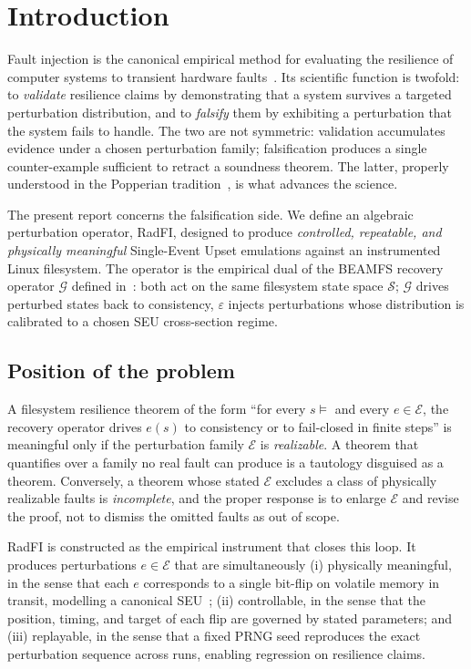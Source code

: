 \section{Introduction}\label{sec:intro}

Fault injection is the canonical empirical method for evaluating the
resilience of computer systems to transient hardware
faults~\cite{carreira1998xception,hsueh1997faultinjection,giuffrida2013edfi}.
Its scientific function is twofold: to \emph{validate} resilience
claims by demonstrating that a system survives a targeted
perturbation distribution, and to \emph{falsify} them by exhibiting a
perturbation that the system fails to handle. The two are not
symmetric: validation accumulates evidence under a chosen
perturbation family; falsification produces a single counter-example
sufficient to retract a soundness theorem. The latter, properly
understood in the Popperian tradition~\cite{popper1959logic}, is what
advances the science.

The present report concerns the falsification side. We define an
algebraic perturbation operator, RadFI, designed to produce
\emph{controlled, repeatable, and physically meaningful} Single-Event
Upset emulations against an instrumented Linux filesystem. The
operator is the empirical dual of the BEAMFS recovery operator
\(\mathcal{G}\) defined in~\cite{desbrieres2026beamfsv1}: both act on
the same filesystem state space \(\mathcal{S}\); \(\mathcal{G}\)
drives perturbed states back to consistency, \(\varepsilon\) injects
perturbations whose distribution is calibrated to a chosen SEU
cross-section regime.

\subsection{Position of the problem}

A filesystem resilience theorem of the form ``for every
\(s \models\) and every \(e \in \mathcal{E}\), the recovery operator
drives \(e(s)\) to consistency or to fail-closed in finite steps'' is
meaningful only if the perturbation family \(\mathcal{E}\) is
\emph{realizable}. A theorem that quantifies over a family no real
fault can produce is a tautology disguised as a theorem. Conversely,
a theorem whose stated \(\mathcal{E}\) excludes a class of physically
realizable faults is \emph{incomplete}, and the proper response is
to enlarge \(\mathcal{E}\) and revise the proof, not to dismiss the
omitted faults as out of scope.

RadFI is constructed as the empirical instrument that closes this
loop. It produces perturbations \(e \in \mathcal{E}\) that are
simultaneously (i) physically meaningful, in the sense that each
\(e\) corresponds to a single bit-flip on volatile memory in
transit, modelling a canonical
SEU~\cite{dodd2003seu,baumann2005softerrors}; (ii) controllable, in
the sense that the position, timing, and target of each flip are
governed by stated parameters; and (iii) replayable, in the sense
that a fixed PRNG seed reproduces the exact perturbation sequence
across runs, enabling regression on resilience claims.

